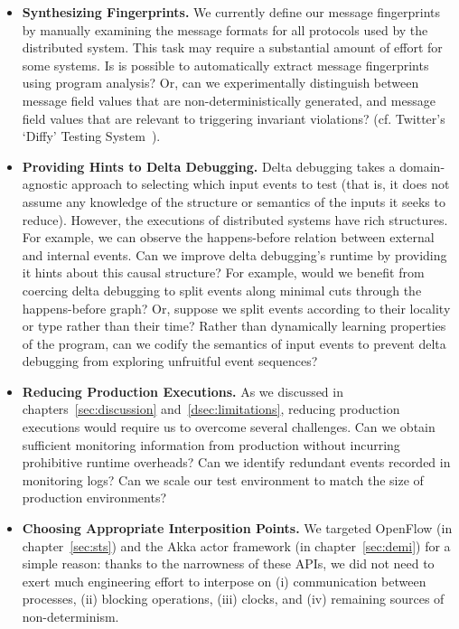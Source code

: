 \begin{itemize}
\item \textbf{Synthesizing Fingerprints.} We currently define our message
fingerprints by manually examining the message formats for all protocols used
by the distributed system. This task may require a substantial amount of
effort for some systems. Is is possible to automatically extract
message fingerprints using program analysis? Or, can we experimentally
distinguish between message field values that are non-deterministically
generated, and message field values that are relevant to triggering invariant
violations? (cf. Twitter's `Diffy' Testing System~\cite{diffy}).

\item \textbf{Providing Hints to Delta Debugging.} Delta debugging takes a
domain-agnostic approach to selecting which input events to
test (that is, it does not assume any knowledge of the structure or semantics
of the inputs it seeks to reduce). However, the executions of distributed systems have
rich structures. For example, we can observe the happens-before relation
between external and internal events. Can we improve delta debugging's runtime by
providing it hints about this causal structure? For example, would we benefit
from coercing delta debugging to split events along minimal cuts through the
happens-before graph? Or, suppose we split events according to their locality or type rather
than their time? Rather than dynamically learning properties of the
program, can we codify the semantics of input events to prevent delta
debugging from exploring unfruitful event sequences?

\item \textbf{Reducing Production Executions.} As we discussed in
chapters~\ref{sec:discussion} and~\ref{dsec:limitations}, reducing production
executions would require us to overcome several challenges. Can we obtain
sufficient monitoring information from production without incurring
prohibitive runtime overheads? Can we identify redundant events recorded in
monitoring logs? Can we scale our test environment to match the size of production
environments?

\item \textbf{Choosing Appropriate Interposition Points.} We targeted
OpenFlow (in chapter~\ref{sec:sts}) and the Akka actor framework (in
chapter~\ref{sec:demi}) for a simple reason: thanks to the narrowness of
these APIs, we did not need to exert much
engineering effort to interpose on (i) communication
between processes, (ii) blocking operations, (iii) clocks, and (iv) remaining sources of non-determinism.


\end{itemize}
